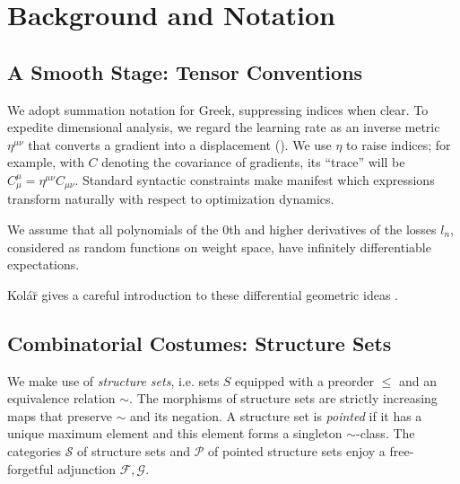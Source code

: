 \documentclass{article}
\newcommand{\Free}{\mathcal{F}}
\newcommand{\Forg}{\mathcal{G}}
\newcommand{\Ss}{\mathcal{S}}
\newcommand{\Pp}{\mathcal{P}}
\begin{document}

\section{Background and Notation}


    \subsection{A Smooth Stage: Tensor Conventions}
        We adopt summation notation for Greek, suppressing indices when clear.
        To expedite dimensional analysis, we regard the learning rate as an
        inverse metric $\eta^{\mu\nu}$ that converts a gradient into a
        displacement (\cite{bo13}).  We use $\eta$ to raise indices; for
        example, with $C$ denoting the covariance of gradients, its ``trace''
        will be $C^{\mu}_{\mu} = \eta^{\mu\nu} C_{\mu\nu}$.  Standard syntactic
        constraints make manifest which expressions transform naturally with
        respect to optimization dynamics.
        
        We assume that all polynomials of the $0$th and higher derivatives of
        the losses $l_n$, considered as random functions on weight space, have
        infinitely differentiable expectations.
        
        Kol\'{a}\u{r} gives a careful introduction to these differential
        geometric ideas .

    
    \subsection{Combinatorial Costumes: Structure Sets}
        We make use of \emph{structure sets}, i.e. sets $S$ equipped with a
        preorder $\leq$ and an equivalence relation $\sim$.  The morphisms of
        structure sets are strictly increasing maps that preserve $\sim$ and
        its negation.  A structure set is \emph{pointed} if it has a unique
        maximum element and this element forms a singleton $\sim$-class.  The
        categories $\Ss$ of structure sets and $\Pp$ of pointed structure sets
        enjoy a free-forgetful adjunction $\Free, \Forg$.
    
\end{document}
